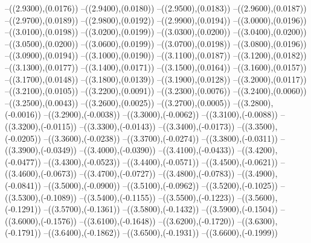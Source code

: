 {	--({\sx*(2.9300)},{\sy*(0.0176)})
	--({\sx*(2.9400)},{\sy*(0.0180)})
	--({\sx*(2.9500)},{\sy*(0.0183)})
	--({\sx*(2.9600)},{\sy*(0.0187)})
	--({\sx*(2.9700)},{\sy*(0.0189)})
	--({\sx*(2.9800)},{\sy*(0.0192)})
	--({\sx*(2.9900)},{\sy*(0.0194)})
	--({\sx*(3.0000)},{\sy*(0.0196)})
	--({\sx*(3.0100)},{\sy*(0.0198)})
	--({\sx*(3.0200)},{\sy*(0.0199)})
	--({\sx*(3.0300)},{\sy*(0.0200)})
	--({\sx*(3.0400)},{\sy*(0.0200)})
	--({\sx*(3.0500)},{\sy*(0.0200)})
	--({\sx*(3.0600)},{\sy*(0.0199)})
	--({\sx*(3.0700)},{\sy*(0.0198)})
	--({\sx*(3.0800)},{\sy*(0.0196)})
	--({\sx*(3.0900)},{\sy*(0.0194)})
	--({\sx*(3.1000)},{\sy*(0.0190)})
	--({\sx*(3.1100)},{\sy*(0.0187)})
	--({\sx*(3.1200)},{\sy*(0.0182)})
	--({\sx*(3.1300)},{\sy*(0.0177)})
	--({\sx*(3.1400)},{\sy*(0.0171)})
	--({\sx*(3.1500)},{\sy*(0.0164)})
	--({\sx*(3.1600)},{\sy*(0.0157)})
	--({\sx*(3.1700)},{\sy*(0.0148)})
	--({\sx*(3.1800)},{\sy*(0.0139)})
	--({\sx*(3.1900)},{\sy*(0.0128)})
	--({\sx*(3.2000)},{\sy*(0.0117)})
	--({\sx*(3.2100)},{\sy*(0.0105)})
	--({\sx*(3.2200)},{\sy*(0.0091)})
	--({\sx*(3.2300)},{\sy*(0.0076)})
	--({\sx*(3.2400)},{\sy*(0.0060)})
	--({\sx*(3.2500)},{\sy*(0.0043)})
	--({\sx*(3.2600)},{\sy*(0.0025)})
	--({\sx*(3.2700)},{\sy*(0.0005)})
	--({\sx*(3.2800)},{\sy*(-0.0016)})
	--({\sx*(3.2900)},{\sy*(-0.0038)})
	--({\sx*(3.3000)},{\sy*(-0.0062)})
	--({\sx*(3.3100)},{\sy*(-0.0088)})
	--({\sx*(3.3200)},{\sy*(-0.0115)})
	--({\sx*(3.3300)},{\sy*(-0.0143)})
	--({\sx*(3.3400)},{\sy*(-0.0173)})
	--({\sx*(3.3500)},{\sy*(-0.0205)})
	--({\sx*(3.3600)},{\sy*(-0.0238)})
	--({\sx*(3.3700)},{\sy*(-0.0274)})
	--({\sx*(3.3800)},{\sy*(-0.0311)})
	--({\sx*(3.3900)},{\sy*(-0.0349)})
	--({\sx*(3.4000)},{\sy*(-0.0390)})
	--({\sx*(3.4100)},{\sy*(-0.0433)})
	--({\sx*(3.4200)},{\sy*(-0.0477)})
	--({\sx*(3.4300)},{\sy*(-0.0523)})
	--({\sx*(3.4400)},{\sy*(-0.0571)})
	--({\sx*(3.4500)},{\sy*(-0.0621)})
	--({\sx*(3.4600)},{\sy*(-0.0673)})
	--({\sx*(3.4700)},{\sy*(-0.0727)})
	--({\sx*(3.4800)},{\sy*(-0.0783)})
	--({\sx*(3.4900)},{\sy*(-0.0841)})
	--({\sx*(3.5000)},{\sy*(-0.0900)})
	--({\sx*(3.5100)},{\sy*(-0.0962)})
	--({\sx*(3.5200)},{\sy*(-0.1025)})
	--({\sx*(3.5300)},{\sy*(-0.1089)})
	--({\sx*(3.5400)},{\sy*(-0.1155)})
	--({\sx*(3.5500)},{\sy*(-0.1223)})
	--({\sx*(3.5600)},{\sy*(-0.1291)})
	--({\sx*(3.5700)},{\sy*(-0.1361)})
	--({\sx*(3.5800)},{\sy*(-0.1432)})
	--({\sx*(3.5900)},{\sy*(-0.1504)})
	--({\sx*(3.6000)},{\sy*(-0.1576)})
	--({\sx*(3.6100)},{\sy*(-0.1648)})
	--({\sx*(3.6200)},{\sy*(-0.1720)})
	--({\sx*(3.6300)},{\sy*(-0.1791)})
	--({\sx*(3.6400)},{\sy*(-0.1862)})
	--({\sx*(3.6500)},{\sy*(-0.1931)})
	--({\sx*(3.6600)},{\sy*(-0.1999)})
}
